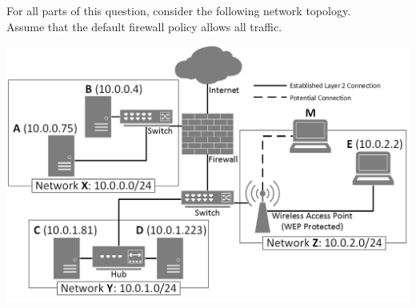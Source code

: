 
For all parts of this question, consider the following network topology.\\
Assume that the default firewall policy allows all traffic.
\begin{center}
    \includegraphics[scale = 0.55]{topology} \\
\end{center}

